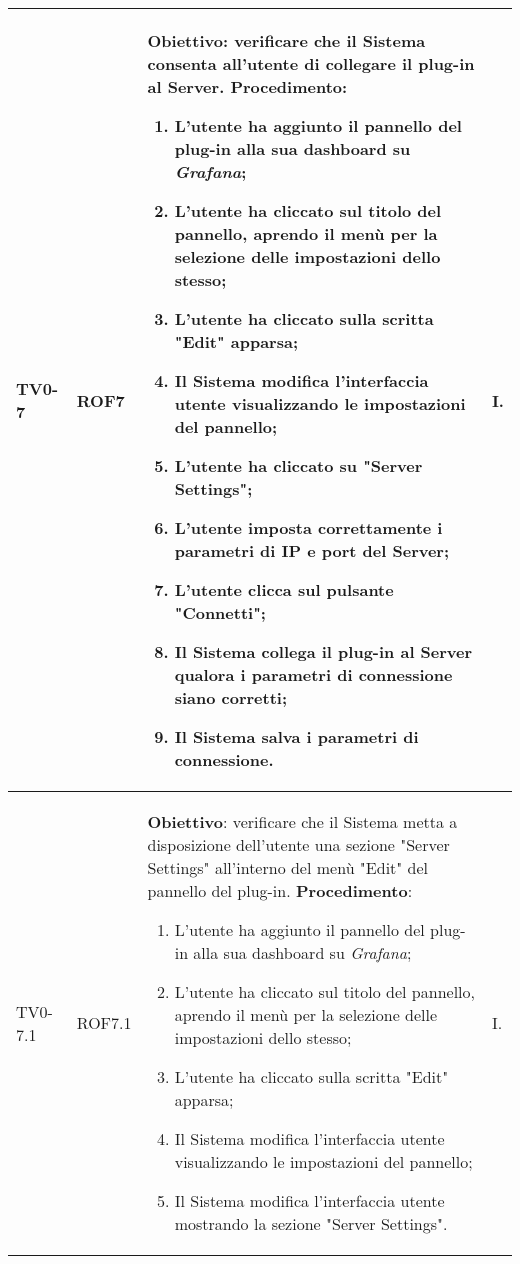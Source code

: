 \begin{longtable}{|C{.15\textwidth}|C{.13\textwidth}|m{.52\textwidth}|C{.08\textwidth}|}
TV0-7 & ROF7 &
	\textbf{Obiettivo}: verificare che il Sistema consenta all'utente di collegare il plug-in al Server. \newline
	\textbf{Procedimento}:
	\begin{enumerate}
		\item L'utente ha aggiunto il pannello del plug-in alla sua dashboard su \textit{Grafana};
		\item L'utente ha cliccato sul titolo del pannello, aprendo il menù per la selezione delle impostazioni dello stesso;
		\item L'utente ha cliccato sulla scritta "Edit" apparsa;
		\item Il Sistema modifica l'interfaccia utente visualizzando le impostazioni del pannello;
		\item L'utente ha cliccato su "Server Settings";
		\item L'utente imposta correttamente i parametri di IP e port del Server;
		\item L'utente clicca sul pulsante "Connetti";
		\item Il Sistema collega il plug-in al Server qualora i parametri di connessione siano corretti;
		\item Il Sistema salva i parametri di connessione.
	\end{enumerate}
	& I. \\
\hline

TV0-7.1 & ROF7.1 &
	\textbf{Obiettivo}: verificare che il Sistema metta a disposizione dell'utente una sezione "Server Settings" all'interno del menù "Edit" del pannello del plug-in. \newline
	\textbf{Procedimento}:
	\begin{enumerate}
		\item L'utente ha aggiunto il pannello del plug-in alla sua dashboard su \textit{Grafana};
		\item L'utente ha cliccato sul titolo del pannello, aprendo il menù per la selezione delle impostazioni dello stesso;
		\item L'utente ha cliccato sulla scritta "Edit" apparsa;
		\item Il Sistema modifica l'interfaccia utente visualizzando le impostazioni del pannello;
		\item Il Sistema modifica l'interfaccia utente mostrando la sezione "Server Settings".
	\end{enumerate}
	& I. \\
\hline


\end{longtable}
